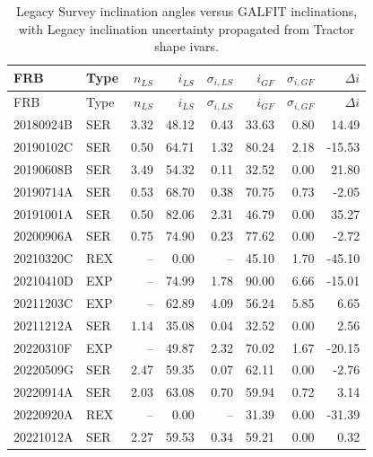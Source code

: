 \begin{longtable}{llrrrrrr}
\caption{Legacy Survey inclination angles versus GALFIT inclinations, with Legacy inclination uncertainty propagated from Tractor shape ivars.}\label{tab:legacy_vs_galfit} \\
\hline
 FRB & Type & $n_{LS}$ & $i_{LS}$ & $\sigma_{i,LS}$ & $i_{GF}$ & $\sigma_{i,GF}$ & $\Delta i$ \\
\hline
\endfirsthead
\hline
 FRB & Type & $n_{LS}$ & $i_{LS}$ & $\sigma_{i,LS}$ & $i_{GF}$ & $\sigma_{i,GF}$ & $\Delta i$ \\
\hline
\endhead
 20180924B & SER & 3.32 & 48.12 & 0.43 & 33.63 & 0.80 & 14.49 \\
 20190102C & SER & 0.50 & 64.71 & 1.32 & 80.24 & 2.18 & -15.53 \\
 20190608B & SER & 3.49 & 54.32 & 0.11 & 32.52 & 0.00 & 21.80 \\
 20190714A & SER & 0.53 & 68.70 & 0.38 & 70.75 & 0.73 & -2.05 \\
 20191001A & SER & 0.50 & 82.06 & 2.31 & 46.79 & 0.00 & 35.27 \\
 20200906A & SER & 0.75 & 74.90 & 0.23 & 77.62 & 0.00 & -2.72 \\
 20210320C & REX & -- & 0.00 & -- & 45.10 & 1.70 & -45.10 \\
 20210410D & EXP & -- & 74.99 & 1.78 & 90.00 & 6.66 & -15.01 \\
 20211203C & EXP & -- & 62.89 & 4.09 & 56.24 & 5.85 & 6.65 \\
 20211212A & SER & 1.14 & 35.08 & 0.04 & 32.52 & 0.00 & 2.56 \\
 20220310F & EXP & -- & 49.87 & 2.32 & 70.02 & 1.67 & -20.15 \\
 20220509G & SER & 2.47 & 59.35 & 0.07 & 62.11 & 0.00 & -2.76 \\
 20220914A & SER & 2.03 & 63.08 & 0.70 & 59.94 & 0.72 & 3.14 \\
 20220920A & REX & -- & 0.00 & -- & 31.39 & 0.00 & -31.39 \\
 20221012A & SER & 2.27 & 59.53 & 0.34 & 59.21 & 0.00 & 0.32 \\
\hline
\end{longtable}